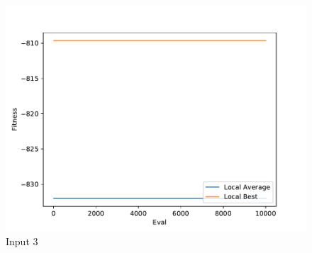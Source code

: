\documentclass{standalone}
\begin{document}
\begin{figure}[!htb]
	\caption{Input 3}
	\label{fig:graph_3053}
	\includegraphics[width=\textwidth]{../graphs/graphs/3053.pdf}
\end{figure}
\end{document}
